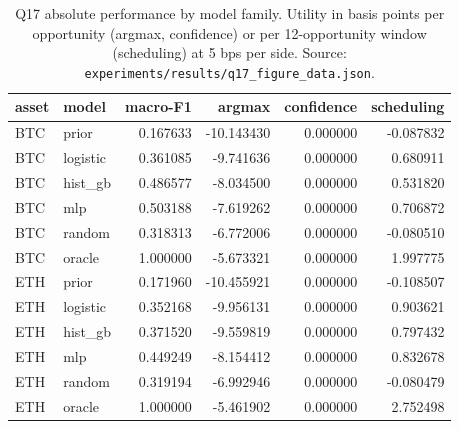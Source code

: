 \begin{table}[h]\centering
\caption{Q17 absolute performance by model family. Utility in basis points per
opportunity (argmax, confidence) or per 12-opportunity window (scheduling) at 5 bps per
side. Source: \texttt{experiments/results/q17\_figure\_data.json}.}
\label{tab:q17abs}
\begin{tabular}{llrrrr}
\toprule
asset & model & macro-F1 & argmax & confidence & scheduling \\
\midrule
BTC & prior & 0.167633 & -10.143430 & 0.000000 & -0.087832 \\
BTC & logistic & 0.361085 & -9.741636 & 0.000000 & 0.680911 \\
BTC & hist\_gb & 0.486577 & -8.034500 & 0.000000 & 0.531820 \\
BTC & mlp & 0.503188 & -7.619262 & 0.000000 & 0.706872 \\
BTC & random & 0.318313 & -6.772006 & 0.000000 & -0.080510 \\
BTC & oracle & 1.000000 & -5.673321 & 0.000000 & 1.997775 \\
ETH & prior & 0.171960 & -10.455921 & 0.000000 & -0.108507 \\
ETH & logistic & 0.352168 & -9.956131 & 0.000000 & 0.903621 \\
ETH & hist\_gb & 0.371520 & -9.559819 & 0.000000 & 0.797432 \\
ETH & mlp & 0.449249 & -8.154412 & 0.000000 & 0.832678 \\
ETH & random & 0.319194 & -6.992946 & 0.000000 & -0.080479 \\
ETH & oracle & 1.000000 & -5.461902 & 0.000000 & 2.752498 \\
\bottomrule
\end{tabular}
\end{table}
